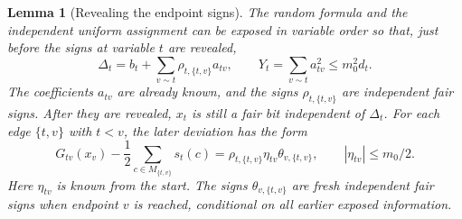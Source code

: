 \documentclass[11pt,a4paper]{article}
\newtheorem{lemma}[theorem]{Lemma}
\theoremstyle{definition}
\theoremstyle{remark}
\begin{document}
\begin{lemma}[Revealing the endpoint signs]\label{lem:random_exposure}
The random formula and the independent uniform assignment can be exposed
in variable order so that, just before the signs at variable $t$ are
revealed,
\[
 \Delta_t=b_t+\sum_{v\sim t}\rho_{t,\{t,v\}}a_{tv},
 \qquad Y_t=\sum_{v\sim t}a_{tv}^2\le m_0^2d_t.
\]
The coefficients $a_{tv}$ are already known, and the signs
$\rho_{t,\{t,v\}}$ are independent fair signs. After they are revealed,
$x_t$ is still a fair bit independent of $\Delta_t$.
For each edge $\{t,v\}$ with $t<v$, the later deviation has the form
\[
 G_{tv}(x_v)-\frac12\sum_{c\in M_{\{t,v\}}}s_t(c)
   =\rho_{t,\{t,v\}}\eta_{tv}\theta_{v,\{t,v\}},
 \qquad |\eta_{tv}|\le m_0/2.
\]
Here $\eta_{tv}$ is known from the start. The signs
$\theta_{v,\{t,v\}}$ are fresh independent fair signs when endpoint $v$
is reached, conditional on all earlier exposed information.
\end{lemma}
\end{document}
